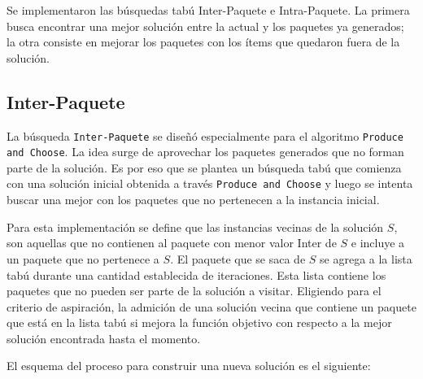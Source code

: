Se implementaron las búsquedas tabú Inter-Paquete e Intra-Paquete. La primera busca encontrar una mejor solución entre la actual y los paquetes ya generados; la otra consiste en mejorar los paquetes con los ítems que quedaron fuera de la solución.

\subsection{Inter-Paquete}
La búsqueda \texttt{Inter-Paquete} se diseñó especialmente para el algoritmo \texttt{Produce and Choose}. La idea surge de aprovechar los paquetes generados que no forman parte de la solución. Es por eso que se plantea un búsqueda tabú que comienza con una solución inicial obtenida a través \texttt{Produce and Choose} y luego se intenta buscar una mejor con los paquetes que no pertenecen a la instancia inicial. 

Para esta implementación se define que las instancias vecinas de la solución $S$, son aquellas que no contienen al paquete con menor valor Inter de $S$ e incluye a un paquete que no pertenece a $S$. El paquete que se saca de $S$ se agrega a la lista tabú durante una cantidad establecida de iteraciones. Esta lista contiene los paquetes que no pueden ser parte de la solución a visitar. Eligiendo para el criterio de aspiración, la admición de una solución vecina que contiene un paquete que está en la lista tabú si mejora la función objetivo con respecto a la mejor solución encontrada hasta el momento. 

El esquema del proceso para construir una nueva soluci\'on es el siguiente:

